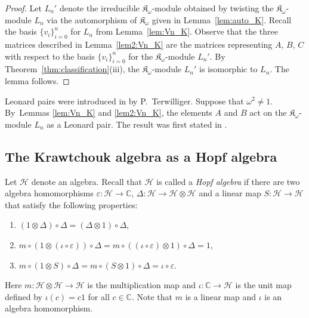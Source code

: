 \documentclass[pdftex]{sigma}%
\def\C{\mathbb C}
\def\H{\mathcal H}
\def\K{\mathfrak K_\omega}
\def\e{\varepsilon}
\numberwithin{equation}{section}
\begin{document}
\begin{proof}
Let $L_n'$ denote the irreducible $\K$-module obtained by twisting the $\K$-module $L_n$ via the automorphism of $\K$ given in Lemma~\ref{lem:auto_K}.
Recall the basis $\{v_i\}_{i=0}^n$ for $L_n$ from Lemma~\ref{lem:Vn_K}. Observe that the three matrices described in Lemma~\ref{lem2:Vn_K} are the matrices representing $A$, $B$, $C$ with respect to the basis $\{v_i\}_{i=0}^n$ for the $\K$-module $L_n'$.
By Theorem~\ref{thm:classification}(iii), the $\K$-module $L_n'$ is isomorphic to $L_n$. The lemma follows.
\end{proof}

Leonard pairs were introduced in \cite{LP-dual,Askeyscheme,lp&awrelation} by P.~Terwilliger. Suppose that $\omega^2\not=1$. By~Lemmas \ref{lem:Vn_K} and \ref{lem2:Vn_K}, the elements $A$ and $B$ act on the $\K$-module $L_n$ as a Leonard pair. The result was first stated in \cite[Theorem 6.3]{K&sl2}.

\subsection{The Krawtchouk algebra as a Hopf algebra}%

Let $\H$ denote an algebra.
Recall that $\H$ is called a {\it Hopf algebra} if there are two algebra homomorphisms $\e\colon \H\to \C$, $\Delta\colon \H\to \H \otimes \H$
and a linear map $S\colon \H\to \H$
that satisfy the following properties:
\begin{enumerate}\itemsep=0pt
\item[(H1)] $(1\otimes \Delta)\circ \Delta=(\Delta\otimes 1)\circ \Delta$,

\item[(H2)]
$m\circ(1\otimes (\iota \circ \e))\circ \Delta=m\circ( (\iota \circ \e)\otimes 1)\circ \Delta=1$,

\item[(H3)] $m\circ (1\otimes S)\circ \Delta=m\circ (S\otimes 1)\circ \Delta=\iota\circ \e$.
\end{enumerate}
Here $m\colon \H\otimes\H\to \H$ is the multiplication map and $\iota\colon \C\to \H$ is the unit map defined by $\iota(c)=c 1$ for all $c\in\C$.
Note that $m$ is a linear map and $\iota$ is an algebra homomorphism.
\end{document}
